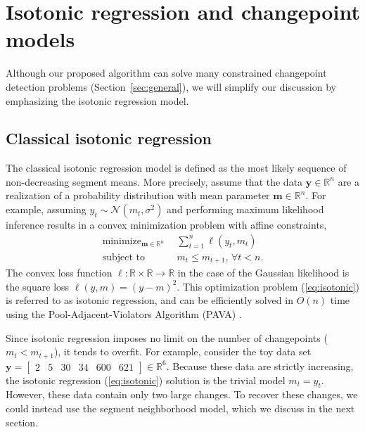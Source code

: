 \documentclass{article}
\DeclareMathOperator*{\minimize}{minimize}
\newcommand{\RR}{\mathbb R}
\begin{document}


\section{Isotonic regression and changepoint models}
\label{sec:models}

Although our proposed algorithm can solve many constrained changepoint
detection problems (Section~\ref{sec:general}), we will simplify our
discussion by emphasizing the isotonic regression model. 

\subsection{Classical isotonic regression}

The classical isotonic regression model is defined as the most likely
sequence of non-decreasing segment means. More
precisely, assume that the data $\mathbf y\in\RR^n$ are a realization
of a probability distribution with mean parameter $\mathbf m\in\RR^n$. For
example, assuming $y_t \sim \mathcal N(m_t, \sigma^2)$ and performing
maximum likelihood inference results in a convex minimization problem
with affine constraints,
\begin{align}
  \label{eq:isotonic}
  \minimize_{\mathbf m\in\RR^n} &\ \ 
  \sum_{t=1}^n \ell(y_t, m_t)\\
  \text{subject to} & \ \ m_t \leq m_{t+1},\, \forall t<n.
  \nonumber
\end{align}
The convex loss function $\ell:\RR\times \RR\rightarrow\RR$ in the
case of the Gaussian likelihood is the square loss
$\ell(y, m) = (y-m)^2$. This optimization problem (\ref{eq:isotonic})
is referred to as isotonic regression, and can be efficiently solved
in $O(n)$ time using the Pool-Adjacent-Violators Algorithm (PAVA)
\citep{isotonic-unifying}.

Since isotonic regression imposes no limit on the number of
changepoints ($m_t < m_{t+1}$), it tends to overfit. For example,
consider the toy data set $\mathbf y= \left[
\begin{array}{cccccc}
  2 & 5 & 30 & 34 & 600 & 621
\end{array}
\right] \in\RR^6$. Because these data are strictly increasing, the
isotonic regression (\ref{eq:isotonic}) solution is the trivial model
$m_t=y_t$. However, these data contain only two large changes. To
recover these changes, we could instead use the segment neighborhood
model, which we discuss in the next section.
\end{document}
